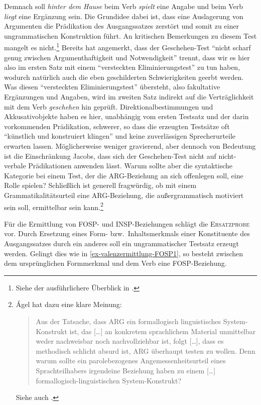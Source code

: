 \largerpage%
Demnach soll {\it hinter dem Hause} beim Verb {\it spielt} eine Angabe und beim Verb {\it liegt} eine Ergänzung sein. Die Grundidee dabei ist, dass eine Auslagerung von Argumenten die Prädikation des Ausgangssatzes zerstört und somit zu einer ungrammatischen Konstruktion führt. An kritischen Bemerkungen zu diesem Test mangelt es nicht.\footnote{Siehe der ausführlichere Überblick in \citet[178f]{Agel:00}.} Bereits \cite{Jacobs:94} hat angemerkt, dass der Geschehen-Test "`nicht scharf genug zwischen Argumenthaftigkeit und Notwendigkeit"' \citep[Fußnote 16]{Jacobs:94} trennt, dass wir es hier also im ersten Satz mit einem "`versteckten Eliminierungstest"' \citep[178]{Agel:00} zu tun haben, wodurch natürlich auch die eben geschilderten Schwierigkeiten geerbt werden. Was diesen "`versteckten Eliminierungstest"' übersteht, also fakultative Ergänzungen und Angaben, wird im zweiten Satz indirekt auf die Verträglichkeit mit dem Verb {\it geschehen} hin geprüft. Direktionalbestimmungen und Akkusativobjekte haben es hier, unabhängig vom ersten Testsatz und der darin vorkommenden Prädikation, schwerer, so dass die erzeugten Testsätze oft "`künstlich und konstruiert klingen"' \citep[76]{Storrer:92} und keine zuverlässigen Sprecherurteile erwarten lassen. Möglicherweise weniger gravierend, aber dennoch von Bedeutung ist die Einschränkung Jacobs, dass sich der Geschehen-Test nicht auf nicht-verbale Prädikationen anwenden lässt. Warum sollte aber die syntaktische Kategorie bei einem Test, der die ARG-Beziehung an sich offenlegen soll, eine Rolle spielen? Schlie\ss lich ist generell fragwürdig, ob mit einem Grammatikalitätsurteil eine ARG-Beziehung, die au\ss ergrammatisch motiviert sein soll, ermittelbar sein kann.\footnote{\'Agel hat dazu eine klare Meinung: 
\begin{quote}
Aus der Tatsache, dass ARG ein formallogisch linguistisches System-Konstrukt ist, das [\ldots] an konkretem sprachlichem Material unmittelbar weder nachweisbar noch nachvollziehbar ist, folgt [\ldots], dass es methodisch schlicht absurd ist, ARG überhaupt testen zu wollen. Denn warum sollte ein parolebezogenes Angemessenheitsurteil eines Sprachteilhabers irgendeine Beziehung haben zu einem [\ldots] formal\-logisch-linguistischen System-Konstrukt? \citep[179]{Agel:00}
\end{quote} 
Siehe auch \citet[235]{Storrer:92}.}  %




Für die Ermittlung von FOSP- und INSP-Beziehungen schlägt \citet[180]{Agel:00} die \textsc{Ersatzprobe} vor. Durch Ersetzung eines Form- bzw.\ Inhaltsmerkmals einer Konstituente des Ausgangssatzes durch ein anderes soll ein ungrammatischer Testsatz erzeugt werden. Gelingt dies wie in \ref{ex-valenzermittlung-FOSP1}, so besteht zwischen dem ursprünglichen Formmerkmal und dem Verb eine FOSP-Beziehung. 

